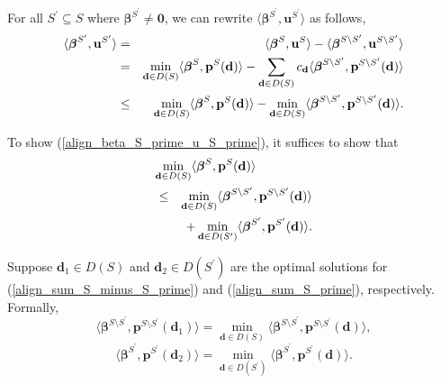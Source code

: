 \documentclass[prodmode,acmtompecs]{acmsmall}
\begin{document}
For all $S^\prime \subseteq S$ where $\boldsymbol{\beta}^{S^\prime} \neq \mathbf{0}$, we can rewrite $\langle \boldsymbol{\beta}^{S^\prime}, \mathbf{u}^{S^\prime} \rangle$ as follows,
\begin{eqnarray*}
\langle \boldsymbol{\beta}^{S^\prime}, \mathbf{u}^{S^\prime} \rangle & = & \langle \boldsymbol{\beta}^{S}, \mathbf{u}^{S} \rangle - \langle \boldsymbol{\beta}^{S \setminus S^\prime}, \mathbf{u}^{S \setminus S^\prime} \rangle	\\
& = & \min\limits_{\mathbf{d} \in D(S)} \langle \boldsymbol{\beta}^S, \mathbf{p}^S(\mathbf{d}) \rangle - \sum\limits_{\mathbf{d} \in D(S)} c_\mathbf{d} \langle \boldsymbol{\beta}^{S \setminus S^\prime}, \mathbf{p}^{S \setminus S^\prime}(\mathbf{d}) \rangle	\\
& \leq & \min\limits_{\mathbf{d} \in D(S)} \langle \boldsymbol{\beta}^S, \mathbf{p}^S(\mathbf{d}) \rangle - \min\limits_{\mathbf{d} \in D(S)} \langle \boldsymbol{\beta}^{S \setminus S^\prime}, \mathbf{p}^{S \setminus S^\prime}(\mathbf{d}) \rangle. 
\end{eqnarray*}

To show (\ref{align_beta_S_prime_u_S_prime}), it suffices to show that
\begin{eqnarray}
\lefteqn{\min\limits_{\mathbf{d} \in D(S)} \langle \boldsymbol{\beta}^S, \mathbf{p}^S(\mathbf{d}) \rangle} \notag \\
& \leq & \min\limits_{\mathbf{d} \in D(S)} \langle \boldsymbol{\beta}^{S \setminus S^\prime}, \mathbf{p}^{S \setminus S^\prime}(\mathbf{d}) \rangle \label{align_sum_S_minus_S_prime}	\\
& & + \min\limits_{\mathbf{d} \in D(S^\prime)} \langle \boldsymbol{\beta}^{S^\prime},  \mathbf{p}^{S^\prime}(\mathbf{d}) \rangle. \label{align_sum_S_prime}
\end{eqnarray}

Suppose $\mathbf{d}_1 \in D(S)$ and $\mathbf{d}_2 \in D(S^\prime)$ are the optimal solutions for (\ref{align_sum_S_minus_S_prime}) and (\ref{align_sum_S_prime}), respectively. Formally, 
$$
\langle \boldsymbol{\beta}^{S \setminus S^\prime}, \mathbf{p}^{S \setminus S^\prime}(\mathbf{d}_1) \rangle = \min\limits_{\mathbf{d} \in D(S)} \langle \boldsymbol{\beta}^{S \setminus S^\prime}, \mathbf{p}^{S \setminus S^\prime}(\mathbf{d}) \rangle, 
$$
$$
\langle \boldsymbol{\beta}^{S^\prime},  \mathbf{p}^{S^\prime}(\mathbf{d}_2) \rangle = \min\limits_{\mathbf{d} \in D(S^\prime)} \langle \boldsymbol{\beta}^{S^\prime},  \mathbf{p}^{S^\prime}(\mathbf{d}) \rangle. 
$$
\end{document}
